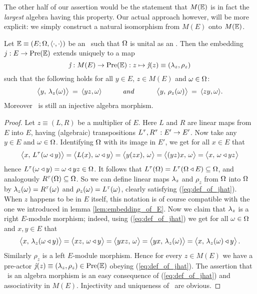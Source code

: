 The other half of our assertion would be the statement that $M(\mathbb{E})$
is in fact the {\em largest\/} algebra having this property.
Our actual approach however, will be more explicit:
we simply construct a natural isomorphism from $M(E)$ onto $M(\mathbb{E})$.

\begin{lemma_sec}  \label{embedding_of_M(E)}
  Let\/ $\mathbb{E} \equiv (E; \Omega, \langle\cdot, \cdot\rangle)$ be an \context\ such that $\Omega$
  is unital as an \Ebimod\@.
  Then the embedding $j: E \rightarrow \mbox{\rm Pre}(\mathbb{E})$ extends uniquely to a map
  $$ \jhat : M(E)\rarr \PreE : z \mapsto \jhat(z)\equiv\lamrho{z} $$
  such that the following holds for all $y\in E$, $z\in M(E)$ and $\omega\in\Omega$:
  \begin{equation}  \label{eq:def_of_jhat}
     \pairM{y}{\lam_z(\om)} \:=\: \pair{yz}{\om}    \itandspace{3em}
     \pairM{y}{\rho_z(\om)} \:=\: \pair{zy}{\om}.
  \end{equation}
  Moreover \jhat\ is still an injective algebra morphism.
\end{lemma_sec}
\begin{proof}
   Let $z\equiv (L,R)$ be a multiplier of $E$. Here $L$ and $R$ are linear maps
   from $E$ into $E$, having (algebraic) transpositions $L^\tau,R^\tau : E' \rightarrow E'$.
   Now take any $y\in E$ and $\omega\in\Omega$.
   Identifying $\Omega$ with its image in $E'$, we get for all $x\in E$ that
   \begin{equation} \label{eq:mod_prop_mult}
      \pairM{x}{L\algtp(\om\ract y)}
         = \pairM{L(x)}{\om \ract y}
         = \pairM{y(zx)}{\om}
         = \pairM{(yz)x}{\om}
         = \pairM{x}{\om \ract yz}
   \end{equation}
   hence $L^\tau(\omega\triangleleft y) = \omega \triangleleft yz \in \Omega$\@.
   It follows that $L^\tau(\Omega) = L^\tau(\Omega \triangleleft E) \subseteq \Omega$, and
   analogously $R^\tau(\Omega) \subseteq \Omega$. So we can define linear maps
   $\lambda_z$ and $\rho_z$ from $\Omega$ into $\Omega$ by
   $\lambda_z(\omega) = R^\tau(\omega)$ and $\rho_z(\omega) = L^\tau(\omega)$,
   clearly satisfying (\ref{eq:def_of_jhat}).
   When $z$ happens to be in $E$ itself, this notation is of course
   compatible with the one we introduced in lemma \ref{lem:embedding_of_E}.
   Now we claim that $\lambda_z$ is a right $E$-module morphism; indeed, using
   (\ref{eq:def_of_jhat}) we get for all $\omega \in \Omega$ and $x,y \in E$ that
   $$ \pairM{x}{\lam_z(\om \ract y)}
            = \pairM{xz}{\om \ract y}
            = \pairM{yxz}{\om}
            = \pairM{yx}{\lam_z(\om)}
            = \pairM{x}{\lam_z(\om) \ract y}.   $$
   Similarly $\rho_z$ is a left $E$-module morphism. Hence for every $z\in M(E)$
   we have a pre-actor $\jhat(z) \equiv \lamrho{z} \in \PreE$
   obeying (\ref{eq:def_of_jhat}).
   The assertion that \jhat\ is an algebra morphism is an easy consequence of
   (\ref{eq:def_of_jhat}) and associativity in $M(E)$.
   Injectivity and uniqueness of \jhat\ are obvious.
\end{proof}



